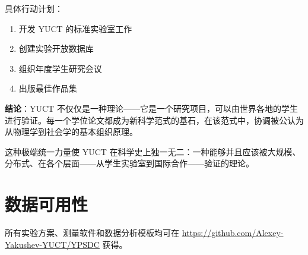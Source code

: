 \documentclass[12pt,a4paper]{article}
\begin{document}
	具体行动计划：
	\begin{enumerate}
		\item 开发 YUCT 的标准实验室工作
		\item 创建实验开放数据库
		\item 组织年度学生研究会议
		\item 出版最佳作品集
	\end{enumerate}
	
	\textbf{结论}：YUCT 不仅仅是一种理论——它是一个研究项目，可以由世界各地的学生进行验证。每一个学位论文都成为新科学范式的基石，在该范式中，协调被公认为从物理学到社会学的基本组织原理。
	
	这种极端统一力量使 YUCT 在科学史上独一无二：一种能够并且应该被大规模、分布式、在各个层面——从学生实验室到国际合作——验证的理论。
	
	\section*{数据可用性}
	所有实验方案、测量软件和数据分析模板均可在 \url{https://github.com/Alexey-Yakushev-YUCT/YPSDC} 获得。
	
\end{document}
